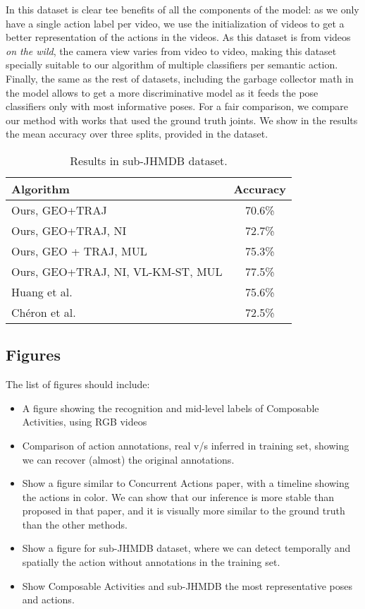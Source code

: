 In this dataset is clear tee benefits of all the components of the model: as we only have a single action label per video, we use the initialization of videos to get a better representation of the actions in the videos. As this dataset is from videos \emph{on the wild}, the camera view varies from video to video, making this dataset specially suitable to our algorithm of multiple classifiers per semantic action. Finally, the same as the rest of datasets, including the garbage collector math in the model allows to get a more discriminative model as it feeds the pose classifiers only with most informative poses. For a fair comparison, we compare our method with works that used the ground truth joints. We show in the results the mean accuracy over three splits, provided in the dataset.

\begin{table}
\centering
\begin{tabular}{|l|c|}
\hline
\textbf{Algorithm} & \textbf{Accuracy}\\
\hline
Ours, GEO+TRAJ & 70.6\%\\
Ours, GEO+TRAJ, NI & 72.7\% \\
Ours, GEO + TRAJ, MUL & 75.3\%\\
Ours, GEO+TRAJ, NI, VL-KM-ST, MUL &  77.5\% \\
\hline
Huang et al. \cite{Jhuang2013} & 75.6\% \\
Ch\'eron et al. \cite{Cheron2015} & 72.5\%\\
\hline
\end{tabular}
\caption{Results in sub-JHMDB dataset. }
\end{table}

\subsection{Figures}
The list of figures should include:
\begin{itemize}
\item A figure showing the recognition and mid-level labels of Composable Activities, using RGB videos
\item Comparison of action annotations, real v/s inferred in training set, showing we can recover (almost) the original annotations.
\item Show a figure similar to Concurrent Actions paper, with a timeline showing the actions in color. We can show that our inference is more stable than proposed in that paper, and it is visually more similar to the ground truth than the other methods.
\item Show a figure for sub-JHMDB dataset, where we can detect temporally and spatially the action without annotations in the training set.
\item Show Composable Activities and sub-JHMDB  the most representative poses and actions.
\end{itemize}

